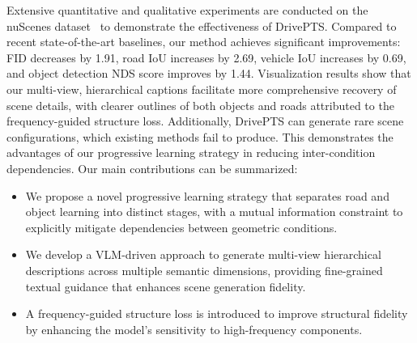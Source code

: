 Extensive quantitative and qualitative experiments are conducted on the nuScenes dataset~\cite{caesar2020nuscenes} to demonstrate the effectiveness of DrivePTS. Compared to recent state-of-the-art baselines, our method achieves significant improvements: FID decreases by 1.91, road IoU increases by 2.69, vehicle IoU increases by 0.69, and object detection NDS score improves by 1.44.
Visualization results show that our multi-view, hierarchical captions facilitate more comprehensive recovery of scene details, with clearer outlines of both objects and roads attributed to the frequency-guided structure loss. 
Additionally, DrivePTS can generate rare scene configurations, which existing methods fail to produce. This demonstrates the advantages of our progressive learning strategy in reducing inter-condition dependencies.
Our main contributions can be summarized:
\begin{itemize}
	\item We propose a novel progressive learning strategy that separates road and object learning into distinct stages, with a mutual information constraint to explicitly mitigate dependencies between geometric conditions.
	
	\item We develop a VLM-driven approach to generate multi-view hierarchical descriptions across multiple semantic dimensions, providing fine-grained textual guidance that enhances scene generation fidelity.
	
	
	\item A frequency-guided structure loss is introduced to improve structural fidelity by enhancing the model's sensitivity to high-frequency components.
\end{itemize}

